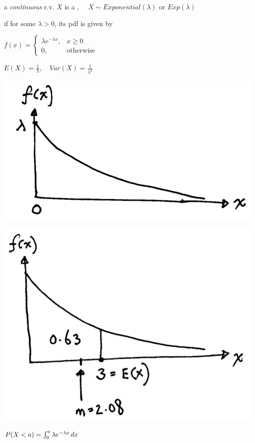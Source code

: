 \documentclass[10pt, landscape]{article}
\begin{document}
\begin{multicols*}{3}
  a \textit{continuous} r.v. $X$ is a , $\quad X \sim Exponential(\lambda)$ or $Exp(\lambda)$ 

  if for some $\lambda > 0$, its pdf is given by 

  \begin{tightcenter}
    $f(x) = \begin{cases} \lambda e^{-\lambda x}, &x \geq 0 \\ 0, &\text{otherwise} \end{cases}$

    $E(X) = \frac{1}{\lambda}, \quad Var(X) = \frac{1}{\lambda^2}$
  \end{tightcenter}

  \begin{minipage}[c]{0.3\linewidth}
    \includegraphics[width=0.95\linewidth]{st2131-exponential-rv.png}
  \end{minipage}
  \begin{minipage}[c]{0.3\linewidth}
    \includegraphics[width=0.95\linewidth]{st2131-exponential-rv-example.png} 
  \end{minipage}
  \begin{minipage}[c]{0.35\linewidth}
    $P(X < a) = \int^a_0 \lambda e^{-\lambda x} \mathop{dx}$
  \end{minipage}


\end{multicols*}
\end{document}
